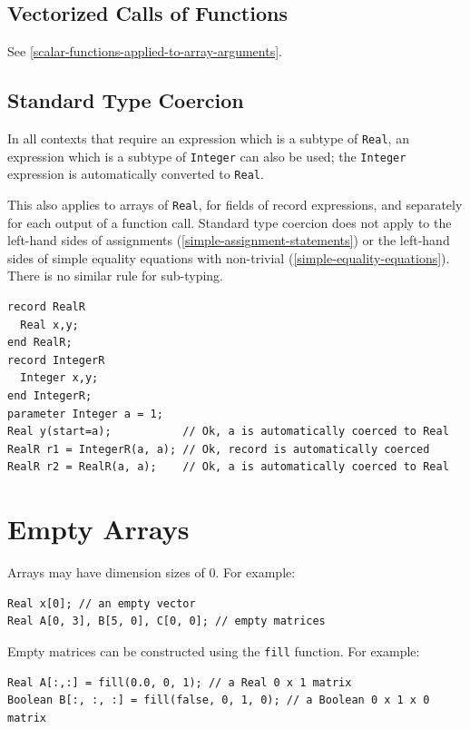 \subsection{Vectorized Calls of Functions}\label{vectorized-calls-of-functions}

See \cref{scalar-functions-applied-to-array-arguments}.

\subsection{Standard Type Coercion}\label{standard-type-coercion}

In all contexts that require an expression which is a subtype of \lstinline!Real!, an expression which is a subtype of \lstinline!Integer! can also be used;
the \lstinline!Integer! expression is automatically converted to \lstinline!Real!.

This also applies to arrays of \lstinline!Real!, for fields of record expressions, and separately for each output of a function call.
Standard type coercion does not apply to the left-hand sides of assignments (\cref{simple-assignment-statements}) or the left-hand sides of simple equality equations with non-trivial  (\cref{simple-equality-equations}).
There is no similar rule for sub-typing.

\begin{example}
\begin{lstlisting}[language=modelica]
record RealR
  Real x,y;
end RealR;
record IntegerR
  Integer x,y;
end IntegerR;
parameter Integer a = 1;
Real y(start=a);           // Ok, a is automatically coerced to Real
RealR r1 = IntegerR(a, a); // Ok, record is automatically coerced
RealR r2 = RealR(a, a);    // Ok, a is automatically coerced to Real
\end{lstlisting}
\end{example}

\section{Empty Arrays}\label{empty-arrays}

Arrays may have dimension sizes of 0.
For example:
\begin{lstlisting}[language=modelica]
Real x[0]; // an empty vector
Real A[0, 3], B[5, 0], C[0, 0]; // empty matrices
\end{lstlisting}

Empty matrices can be constructed using the \lstinline!fill! function.
For example:
\begin{lstlisting}[language=modelica]
Real A[:,:] = fill(0.0, 0, 1); // a Real 0 x 1 matrix
Boolean B[:, :, :] = fill(false, 0, 1, 0); // a Boolean 0 x 1 x 0 matrix
\end{lstlisting}

